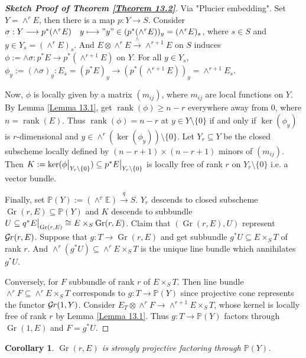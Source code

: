\documentclass{ctexart}
\newtheorem{corollary}{Corollary}[section]
\newcommand{\rank}{\operatorname{rank}}
\newcommand{\grassmannianscheme}[2]{\operatorname{Gr}(#1, #2)}
\newcommand{\grassmanmianfunctor}[2]{\mathcal{G}\kern -.5pt r(#1, #2)}
\begin{document}
\begin{proof}[\textbf{\emph{Sketch Proof of Theorem \ref{Theorem 13.2}}}]
    Via "Plucier embedding".
    Set $Y = \wedge^{r} E$, then there is a map $p: Y \longrightarrow S$.
    Consider $\sigma: Y \longrightarrow p^{\ast}(\wedge^{r} E)\quad y \longmapsto "y"\in (p^{\ast}(\wedge^{r} E))_{y} = (\wedge^{r} E)_{s}$, where $s\in S$ and $y\in Y_{s} = (\wedge^{r} E)_{s}$.
    And $E \otimes \wedge^{r} E \overset{\wedge}{\longrightarrow} \wedge^{r + 1} E$ on $S$ induces $\phi := \wedge\sigma: p^{\ast}E \longrightarrow p^{\ast}(\wedge^{r + 1} E)$ on $Y$.
    For all $y\in Y_{s}$, $\phi_{y} := (\wedge\sigma)_{y}: E_{s} = (p^{\ast}E)_{y} \longrightarrow (p^{\ast}(\wedge^{r + 1} E))_{y} = \wedge^{r + 1} E_{s}$.
    \par
    Now, $\phi$ is locally given by a matrix $(m_{ij})$, where $m_{ij}$ are local functions on $Y$.
    By Lemma \ref{Lemma 13.1}, get $\rank(\phi) \ge n - r$ everywhere away from $0$, where $n = \rank(E)$.
    Thus $\rank(\phi) = n - r$ at $y\in Y \setminus \{0\}$ if and only if $\ker(\phi_{y})$ is $r$-dimensional and $y\in \wedge^{r} (\ker(\phi_{y})) \setminus \{0\}$.
    Let $Y_{r} \subseteq Y$ be the closed subscheme locally defined by $(n - r + 1) \times (n - r + 1)$ minors of $(m_{ij})$.
    Then $K := \ker(\phi\big{|}_{Y_{r} \setminus \{0\}}) \subseteq p^{\ast}E\big{|}_{Y_{r} \setminus \{0\}}$ is locally free of rank $r$ on $Y_{r} \setminus \{0\}$ i.e. a vector bundle.
    \par
    Finally, set $\mathbb{P}(Y) := \mathbb{(\wedge^{r} E)} \overset{q}{\longrightarrow} S$.
    $Y_{r}$ descends to closed subscheme $\grassmannianscheme{r}{E} \subseteq \mathbb{P}(Y)$ and $K$ descends to subbundle $U \subseteq q^{\ast}E\big{|}_{\grassmannianscheme{r}{E}} \cong E \times_{S} \grassmannianscheme{r}{E}$.
    Claim that $(\grassmannianscheme{r}{E}, U)$ represent $\grassmanmianfunctor{r}{E}$.
    Suppose that $g: T \longrightarrow \grassmannianscheme{r}{E}$ and get subbundle $g^{\ast}U \subseteq E \times_{S} T$ of rank $r$.
    And $\wedge^{r} (g^{\ast}U) \subseteq \wedge^{r} E \times_{S} T$ is the unique line bundle which annihilates $g^{\ast}U$.
    \par
    Conversely, for $F$ subbundle of rank $r$ of $E \times_{S} T$.
    Then line bundle $\wedge^{r} F \subseteq \wedge^{r} E \times_{S} T$ corresponds to $g: T \longrightarrow \mathbb{P}(Y)$ since projective cone represents the functor $\grassmanmianfunctor{1}{Y}$.
    Consider $E_{T} \otimes \wedge^{r} F \longrightarrow \wedge^{r + 1} E \times_{S} T$, whose kernel is locally free of rank $r$ by Lemma \ref{Lemma 13.1}.
    Thus $g: T \longrightarrow \mathbb{P}(Y)$ factors through $\grassmannianscheme{1}{E}$ and $F = g^{\ast}U$.
\end{proof}
\begin{corollary}
    $\grassmannianscheme{r}{E}$ is strongly projective factoring through $\mathbb{P}(Y)$.
    \label{Corollary 13.1}
\end{corollary}
\end{document}
